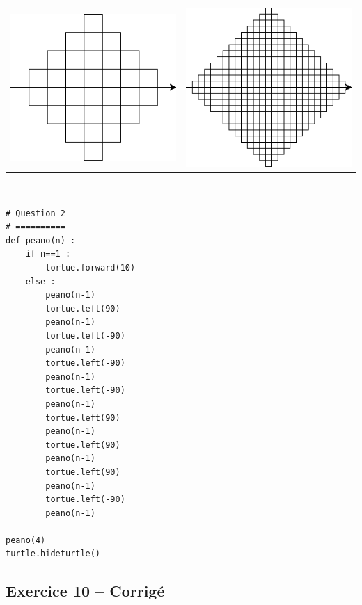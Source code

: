 \documentclass[10pt,fleqn]{article} %
\begin{document}
\begin{center}
\begin{tabular}{cc}
\includegraphics[width=.3\linewidth]{images/exo_FB_09_01}&
\includegraphics[width=.3\linewidth]{images/exo_FB_09_02}
\end{tabular}
\end{center}



\begin{corrige}
$\quad$
\begin{lstlisting}
# Question 2 
# ==========
def peano(n) : 
    if n==1 :
        tortue.forward(10)
    else : 
        peano(n-1)
        tortue.left(90)
        peano(n-1)
        tortue.left(-90)
        peano(n-1)
        tortue.left(-90)
        peano(n-1)
        tortue.left(-90)
        peano(n-1)
        tortue.left(90)
        peano(n-1)
        tortue.left(90)
        peano(n-1)
        tortue.left(90)
        peano(n-1)
        tortue.left(-90)
        peano(n-1)
        
peano(4)
turtle.hideturtle()
\end{lstlisting}
\end{corrige}



\subsection*{Exercice 10 -- Corrigé}
\end{document}
